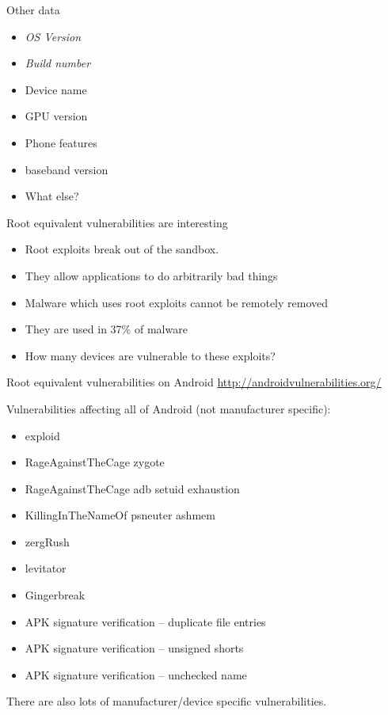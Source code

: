 \documentclass{beamer}
\begin{document}
\begin{frame}{Other data}{}
\begin{itemize}
 \item \Large{ \emph{OS Version}}
 \item \emph{Build number}
 \item Device name
 \item GPU version
 \item Phone features
 \item baseband version
 \item What else?
\end{itemize}
\end{frame}

\begin{frame}{Root equivalent vulnerabilities are interesting}{}
 \begin{itemize}
  \item Root exploits break out of the sandbox.
  \item They allow applications to do arbitrarily bad things
  \item Malware which uses root exploits cannot be remotely removed
  \item They are used in 37\% of malware %
  \item How many devices are vulnerable to these exploits?
 \end{itemize}
\end{frame}

\begin{frame}{Root equivalent vulnerabilities on Android}{}
\small \url{http://androidvulnerabilities.org/}

Vulnerabilities affecting all of Android (not manufacturer specific):
 \begin{itemize}
  \item exploid
  \item RageAgainstTheCage zygote
  \item RageAgainstTheCage adb setuid exhaustion
  \item KillingInTheNameOf psneuter ashmem
  \item zergRush
  \item levitator
  \item Gingerbreak
  \item APK signature verification -- duplicate file entries
  \item APK signature verification -- unsigned shorts
  \item APK signature verification -- unchecked name
 \end{itemize}
There are also lots of manufacturer/device specific vulnerabilities.
\end{frame}
\end{document}
